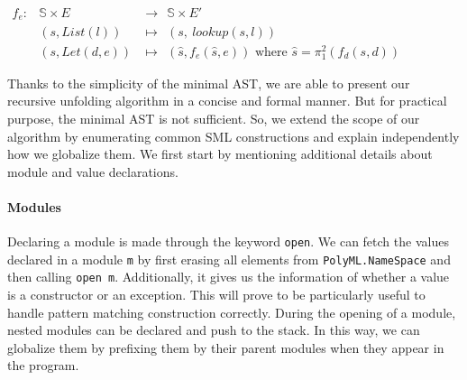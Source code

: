 \documentclass[runningheads,a4paper,draft]{svjour3}
\def\sml{\textsf{SML}\xspace}
\begin{document}
\vspace{5mm}

\begin{math}
\begin{array}{lcl}
f_e:& \mathbb{S} \times E &\rightarrow\ \ \mathbb{S} \times E'\\
& (s, List(l))  &\mapsto\ \ (s,\ lookup(s,l))\\
& (s, Let (d,e)) &\mapsto\ \ (\hat{s}, f_e (\hat{s}, e))
\mbox{ where } \hat{s} = \pi_1^2 (f_d (s,d))
\end{array}
\end{math}

\vspace{5mm}

%




%
%

Thanks to the simplicity of the minimal AST, we are able to present our 
recursive unfolding algorithm in a concise and formal manner. But for practical 
purpose, the minimal AST is not sufficient. So, we extend the scope of our 
algorithm by enumerating common \sml constructions and explain 
independently how we globalize them. We first start by mentioning additional 
details about module and value declarations.

\paragraph{Modules}
Declaring a module is made through the keyword 
\texttt{open}. We can fetch 
the values declared in a module \texttt{m} by first erasing all elements from 
\texttt{PolyML.NameSpace} and then calling \texttt{open m}. Additionally, it 
gives us the information of whether a value is a constructor or an exception. 
This will prove to be particularly useful to handle pattern matching 
construction correctly. During the opening of a module, nested modules can be 
declared and push to the stack. In this way, we can globalize them by prefixing 
them by their parent modules when they appear in the program.
\end{document}
